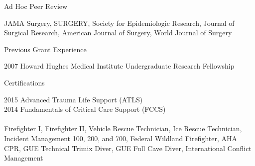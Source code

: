 \documentclass{resume} %
\begin{document}
   
   
   \begin{rSection}{Ad Hoc Peer Review}
 
   JAMA Surgery, SURGERY, Society for Epidemiologic Research, Journal of Surgical Research, American Journal of Surgery, World Journal of Surgery
  
   
   \end{rSection}
   
 
   
   \begin{rSection}{Previous Grant Experience}
  
   2007 \enspace Howard Hughes Medical Institute Undergraduate Research Fellowship 
   
   
   \end{rSection}
   
   
   \begin{rSection}{Certifications}
  
   2015 \enspace Advanced Trauma Life Support (ATLS)\\
   2014 \enspace Fundamentals of Critical Care Support (FCCS) \\
   \\
   Firefighter I, Firefighter II, Vehicle Rescue Technician, Ice Rescue Technician, 
   Incident Management 100, 200, and 700, Federal Wildland Firefighter, AHA CPR,
   GUE Technical Trimix Diver, GUE Full Cave Diver, International Conflict Management
   
   
   \end{rSection}
   

\end{document}
